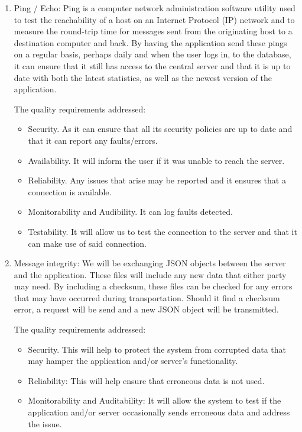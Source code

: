 \documentclass[hidelinks,a4paper,12pt]{article}
\begin{document}
\begin{enumerate}
		\item Ping / Echo:
		Ping is a computer network administration software utility used to test the reachability of a host on an Internet Protocol (IP) network and to measure the round-trip time for messages sent from the originating host to a destination computer and back. By having the application send these pings on a regular basis, perhaps daily and when the user logs in, to the database, it can ensure that it still has access to the central server and that it is up to date with both the latest statistics, as well as the newest version of the application.

		The quality requirements addressed:
		\begin{itemize}
			\item Security. As it can ensure that all its security policies are up to date and that it can report any faults/errors.
			\item Availability. It will inform the user if it was unable to reach the server.
			\item Reliability. Any issues that arise may be reported and it ensures that a connection is available.
			\item Monitorability and Audibility. It can log faults detected.
			\item Testability. It will allow us to test the connection to the server and that it can make use of said connection.
		\end{itemize}
		
		\item Message integrity:
		We will be exchanging JSON objects between the server and the application. These files will include any new data that either party may need. By including a checksum, these files can be checked for any errors that may have occurred during transportation. Should it find a checksum error, a request will be send and a new JSON object will be transmitted.

		The quality requirements addressed:
		\begin{itemize}
			\item Security. This will help to protect the system from corrupted data that may hamper the application and/or server's functionality.
			\item Reliability: This will help ensure that erroneous data is not used.
			\item Monitorability and Auditability: It will allow the system to test if the application and/or server occasionally sends erroneous data and address the issue.
		\end{itemize}
		

\end{enumerate}
\end{document}
